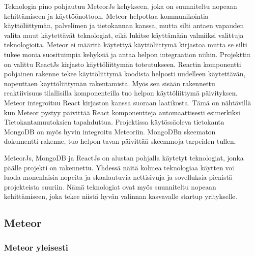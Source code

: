 \documentclass[11pt,a4paper,titlepage,oneside]{article}
\begin{document}
Teknologia pino pohjautuu MeteorJs kehykseen, joka on suunniteltu nopeaan kehittämiseen ja käyttöönottoon.
Meteor helpottaa kommunikointia käyttöliittymän, palvelimen ja tietokannan kanssa, 
mutta silti antaen vapauden valita muut käytettävät teknologiat, eikä lukitse käyttämään valmiiksi valittuja teknologioita.
Meteor ei määritä käytettyä käyttöliittymä kirjastoa mutta se silti tukee monia suosituimpia kehyksiä ja antaa helpon integraation niihin.
Projekttin on valittu ReactJs kirjasto käyttöliittymän toteutukseen.
Reactin komponentti pohjainen rakenne tekee käyttöliittymä koodista helposti uudelleen käytettävän, nopeuttaen käyttöliittymän rakentamista. 
Myös sen sisään rakennettu reaktiivisuus tilallisilla komponenteilla tuo helpon käyttöliittymä päivityksen.
Meteor integroituu React kirjaston kanssa suoraan laatikosta.
Tämä on nähtävillä kun Meteor pystyy päivittää React komponentteja automaattisesti esimerkiksi Tietokantamuutoksien tapahduttua. 
Projektissa käytössäoleva tietokanta MongoDB on myös hyvin integroitu Meteoriin.
MongoDBn skeematon dokumentti rakenne, tuo helpon tavan päivittää skeemmoja tarpeiden tullen.
\medskip


MeteorJs, MongoDB ja ReactJs on alustan pohjalla käytetyt teknologiat, jonka päälle projekti on rakennettu.
Yhdessä näitä kolmea teknologiaa käytten voi luoda monenlaisia nopeita ja skaalautuvia nettisivuja ja sovelluksia pienistä projekteista suuriin.
Nämä teknologiat ovat myös suunniteltu nopeaan kehittämiseen, joka tekee niistä hyvän valinnan kasvavalle startup yritykselle.
\medskip









\newpage
\subsection{Meteor}                %



\subsubsection{Meteor yleisesti}
\end{document}
